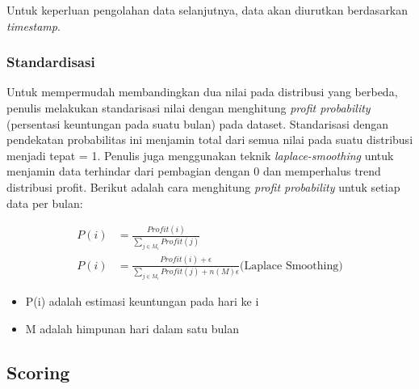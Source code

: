 \documentclass{article}
\begin{document}
\begin{adjustwidth}{4em}{0pt}
	
	\hspace{\parindent}Untuk keperluan pengolahan data selanjutnya, data akan diurutkan berdasarkan \textit{timestamp}.
	
\end{adjustwidth}

\subsubsection{Standardisasi}

\begin{adjustwidth}{4em}{0pt}
	
	\hspace{\parindent}Untuk mempermudah membandingkan dua nilai pada distribusi yang berbeda, penulis melakukan standarisasi nilai dengan menghitung \textit{profit probability} (persentasi keuntungan pada suatu bulan) pada dataset. Standarisasi dengan pendekatan probabilitas ini menjamin total dari semua nilai pada suatu distribusi menjadi tepat = 1. Penulis juga menggunakan teknik \textit{laplace-smoothing} untuk menjamin data terhindar dari pembagian dengan 0 dan memperhalus trend distribusi profit. Berikut adalah cara menghitung \textit{profit probability} untuk setiap data per bulan:
	
	\begin{align*}
	P(i) &= \frac{Profit(i)} {\sum\limits_{j \in M_i} Profit(j)}\\
	P(i) &= \frac{Profit(i)+\epsilon}{\sum\limits_{j \in M_i} Profit(j)+n(M)\epsilon} \text{(Laplace Smoothing)}
	\end{align*}
	
	\begin{itemize}
		\setlength{\itemindent}{1cm}
		\item{P(i) adalah estimasi keuntungan pada hari ke i}
		\item{M adalah himpunan hari dalam satu bulan}
	\end{itemize}
	
\end{adjustwidth}

\subsection{Scoring}
\end{document}
